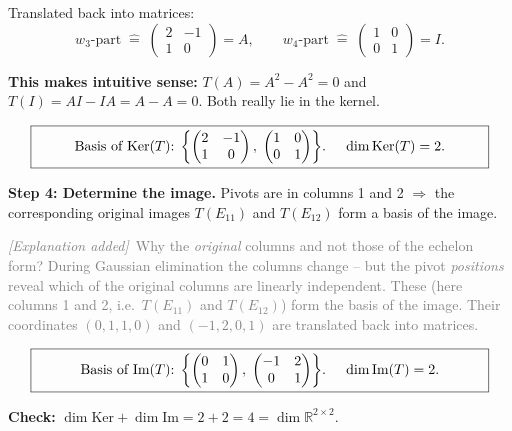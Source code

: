 \documentclass[a4paper,12pt]{article}
\newcommand{\erglerk}{\textcolor{gray}{\small\textit{[Explanation added]}}}
\begin{document}
Translated back into matrices:
\[
w_3\text{-part} \;\widehat{=}\; \begin{pmatrix} 2 & -1 \\ 1 & 0 \end{pmatrix} = A, \qquad
w_4\text{-part} \;\widehat{=}\; \begin{pmatrix} 1 & 0 \\ 0 & 1 \end{pmatrix} = I.
\]

\textbf{This makes intuitive sense:} $T(A) = A^2 - A^2 = 0$ and $T(I) = AI - IA = A - A = 0$. Both really lie in the kernel.

\[
\fbox{\parbox{0.93\textwidth}{\centering
Basis of $\text{Ker}(T)$: $\left\{\begin{pmatrix} 2 & -1 \\ 1 & 0 \end{pmatrix},\; \begin{pmatrix} 1 & 0 \\ 0 & 1 \end{pmatrix}\right\}$. \quad $\dim \text{Ker}(T) = 2$.
}}
\]

\textbf{Step 4: Determine the image.} Pivots are in columns 1 and 2 $\Rightarrow$ the corresponding original images $T(E_{11})$ and $T(E_{12})$ form a basis of the image.

\erglerk\ \textcolor{gray}{\small Why the \emph{original} columns and not those of the echelon form? During Gaussian elimination the columns change -- but the pivot \emph{positions} reveal which of the original columns are linearly independent. These (here columns 1 and 2, i.e.\ $T(E_{11})$ and $T(E_{12})$) form the basis of the image. Their coordinates $(0,1,1,0)$ and $(-1,2,0,1)$ are translated back into matrices.}

\[
\fbox{\parbox{0.93\textwidth}{\centering
Basis of $\text{Im}(T)$: $\left\{\begin{pmatrix} 0 & 1 \\ 1 & 0 \end{pmatrix},\; \begin{pmatrix} -1 & 2 \\ 0 & 1 \end{pmatrix}\right\}$. \quad $\dim \text{Im}(T) = 2$.
}}
\]

\textbf{Check:} $\dim \text{Ker} + \dim \text{Im} = 2 + 2 = 4 = \dim \mathbb{R}^{2\times 2}$. \checkmark
\end{document}
